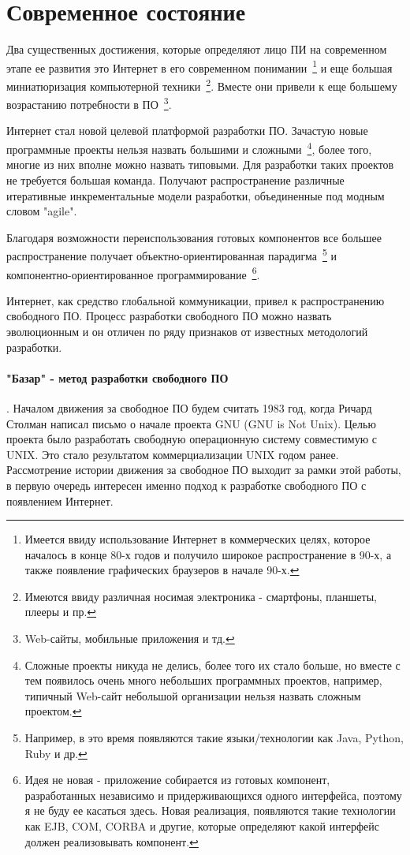 \section{Современное состояние}

Два существенных достижения, которые определяют лицо ПИ на современном этапе ее развития это Интернет в его современном понимании~\footnote{Имеется ввиду использование Интернет в коммерческих целях, которое началось в конце 80-х годов и получило широкое распространение в 90-х, а также появление графических браузеров в начале 90-х.} и еще большая миниатюризация компьютерной техники~\footnote{Имеются ввиду различная носимая электроника - смартфоны, планшеты, плееры и пр.}. Вместе они привели к еще большему возрастанию потребности в ПО~\footnote{Web-сайты, мобильные приложения и тд.}.

Интернет стал новой целевой платформой разработки ПО. Зачастую новые программные проекты нельзя назвать большими и сложными~\footnote{Сложные проекты никуда не делись, более того их стало больше, но вместе с тем появилось очень много небольших программных проектов, например, типичный Web-сайт небольшой организации нельзя назвать сложным проектом.}, более того, многие из них вполне можно назвать типовыми. Для разработки таких проектов не требуется большая команда. Получают распространение различные итеративные инкрементальные модели разработки, объединенные под модным словом "agile".

Благодаря возможности переиспользования готовых компонентов все большее распространение получает объектно-ориентированная парадигма~\footnote{Например, в это время появляются такие языки/технологии как Java, Python, Ruby и др.} и компонентно-ориентированное программирование~\footnote{Идея не новая - приложение собирается из готовых компонент, разработанных независимо и придерживающихся одного интерфейса, поэтому я не буду ее касаться здесь. Новая реализация, появляются такие технологии как EJB, COM, CORBA и другие, которые определяют какой интерфейс должен реализовывать компонент.}.

Интернет, как средство глобальной коммуникации, привел к распространению свободного ПО. Процесс разработки свободного ПО можно назвать эволюционным и он отличен по ряду признаков от известных методологий разработки.

\paragraph{"Базар" - метод разработки свободного ПО}. Началом движения за свободное ПО будем считать 1983 год, когда Ричард Столман написал письмо о начале проекта GNU (GNU is Not Unix). Целью проекта было разработать свободную операционную систему совместимую с UNIX. Это стало результатом коммерциализации UNIX годом ранее. Рассмотрение истории движения за свободное ПО выходит за рамки этой работы, в первую очередь интересен именно подход к разработке свободного ПО с появлением Интернет.

